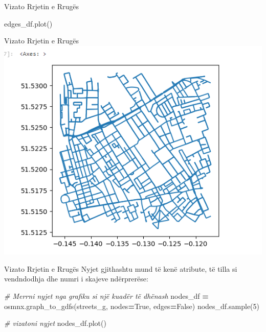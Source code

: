 \documentclass[
  ignorenonframetext,
]{beamer}
\newenvironment{Shaded}{\begin{snugshade}}{\end{snugshade}}
\newcommand{\CommentTok}[1]{\textcolor[rgb]{0.56,0.35,0.01}{\textit{#1}}}
\newcommand{\DecValTok}[1]{\textcolor[rgb]{0.00,0.00,0.81}{#1}}
\newcommand{\NormalTok}[1]{#1}
\newcommand{\OperatorTok}[1]{\textcolor[rgb]{0.81,0.36,0.00}{\textbf{#1}}}
\newcommand{\VariableTok}[1]{\textcolor[rgb]{0.00,0.00,0.00}{#1}}
\begin{document}
\begin{frame}[fragile]{Vizato Rrjetin e Rrugës}
\protect\hypertarget{vizato-rrjetin-e-rruguxebs-6}{}

\begin{Shaded}
\begin{Highlighting}[]
\NormalTok{edges\_df.plot()}
\end{Highlighting}
\end{Shaded}
\end{frame}

\begin{frame}{Vizato Rrjetin e Rrugës}
\protect\hypertarget{vizato-rrjetin-e-rruguxebs-7}{}
\includegraphics{./Figs/rrjetirrugor2.png}
\end{frame}

\begin{frame}[fragile]{Vizato Rrjetin e Rrugës}
\protect\hypertarget{vizato-rrjetin-e-rruguxebs-8}{}
Nyjet gjithashtu mund të kenë atribute, të tilla si vendndodhja dhe
numri i skajeve ndërprerëse:


\begin{Shaded}
\begin{Highlighting}[]
\CommentTok{\# Merrni nyjet nga grafiku si një kuadër të dhënash}
\NormalTok{nodes\_df }\OperatorTok{=}\NormalTok{ osmnx.graph\_to\_gdfs(streets\_g, nodes}\OperatorTok{=}\VariableTok{True}\NormalTok{, edges}\OperatorTok{=}\VariableTok{False}\NormalTok{)}
\NormalTok{nodes\_df.sample(}\DecValTok{5}\NormalTok{)}

\CommentTok{\# vizatoni nyjet}
\NormalTok{nodes\_df.plot()}
\end{Highlighting}
\end{Shaded}
\end{frame}
\end{document}
